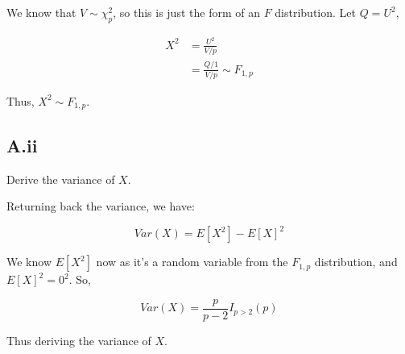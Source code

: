 We know that $V \sim \chi^2_p$, so this is just the form of an $F$ distribution. Let $Q = U^2$,

\vspace{-4mm}
\begin{align*}
	X^2 &= \frac{U^2}{V/p} \\
	&= \frac{Q/1}{V/p} \sim F_{1,p}
\end{align*}

Thus, $X^2 \sim F_{1,p}$.

\subsection*{A.ii}

Derive the variance of $X$.

Returning back the variance, we have:

\[Var(X) = E[X^2] - E[X]^2\]

We know $E[X^2]$ now as it's a random variable from the $F_{1,p}$ distribution, and $E[X]^2 = 0^2$. So,

\[Var(X) = \frac{p}{p-2} I_{p>2}(p)\]

Thus deriving the variance of $X$.
